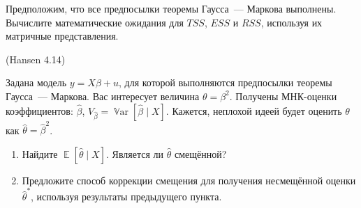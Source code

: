 \documentclass[12pt]{article}
\DeclareMathOperator{\Var}{\mathbb{V}ar}
\DeclareMathOperator{\E}{\mathbb{E}}
\newcommand{\hb}{\hat{\beta}}
\newcommand{\RSS}{RSS}
\newcommand{\ESS}{ESS}
\newcommand{\TSS}{TSS}
\begin{document}
\begin{problem}
Предположим, что все предпосылки теоремы Гаусса~— Маркова выполнены. 
Вычислите математические ожидания для $\TSS$, $\ESS$ и $\RSS$, используя их матричные представления.
\begin{sol}
\end{sol}
\end{problem}

\begin{problem}(Hansen 4.14)

Задана модель $y = X \beta + u$, для которой выполняются предпосылки теоремы Гаусса~— Маркова. 
Вас интересует величина $\theta = \beta^2$. 
Получены МНК-оценки коэффициентов: $\hb$, $V_{\hb} = \Var [\hb \mid X]$. 
Кажется, неплохой идеей будет оценить $\theta$ как $\hat{\theta} = \hb^2$.

\begin{enumerate}
    \item Найдите $\E [\hat{\theta} \mid X]$. Является ли $\hat{\theta}$ смещённой?
    \item Предложите способ коррекции смещения для получения несмещённой оценки  $\hat{\theta}^*$, используя результаты предыдущего пункта.
\end{enumerate}

\begin{sol}
\end{sol}

\end{problem}
\end{document}

